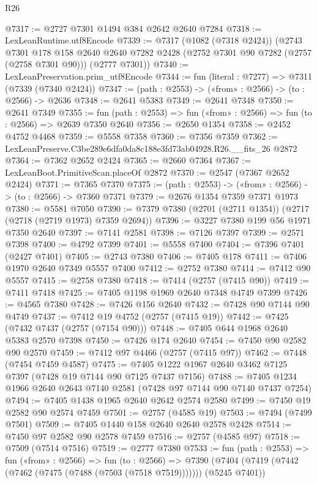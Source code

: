 \begin{lexlean}{R26}
\begin{coremodule}
@7317 := @2727 @7301 @1494 @384 @2642 @2640 @7284
@7318 := LexLeanRuntime.utf8Encode
@7339 := @7317
    (@1082 (@7318 @2424))
    (@2743
      @7301
      @178
      @158
      @2640
      @2640
      @7282
      @2428
      (@2752 @7301 @90 @7282 (@2757 (@2758 @7301 @90)))
      (@2777 @7301))
@7340 := LexLeanPreservation.prim_utf8Encode
@7344 := fun (literal : @7277) => @7311 (@7339 (@7340 @2424))
@7347 := (path : @2553) -> («from» : @2566) -> (to : @2566) -> @2636
@7348 := @2641 @5383
@7349 := @2641 @7348
@7350 := @2641 @7349
@7355 := fun (path : @2553) => fun («from» : @2566) => fun (to : @2566) => @2639 @7350 @2640
@7356 := @2650 @1354
@7358 := @2452 @4752 @4468
@7359 := @5558 @7358
@7360 := @7356 @7359
@7362 := LexLeanPreserve.C3be289e6dfa0da8c188e3fd73ab04928.R26.__fits_26 @2872
@7364 := @7362 @2652 @2424
@7365 := @2660 @7364
@7367 := LexLeanBoot.PrimitiveScan.placeOf @2872
@7370 := @2547 (@7367 @2652 @2424)
@7371 := @7365 @7370
@7375 := (path : @2553) -> («from» : @2566) -> (to : @2566) -> @7360 @7371
@7379 := @2676 @1354 @7359 @7371 @1973
@7380 := @5581 @7050
@7390 := @7379 @7380 (@2701 (@2711 @1354)) (@2717 (@2718 (@2719 @1973) @7359 @2694))
@7396 := @3227 @7380 @199 @56 @1971 @7350 @2640
@7397 := @7141 @2581
@7398 := @7126 @7397
@7399 := @2571 @7398
@7400 := @4792 @7399
@7401 := @5558 @7400
@7404 := @7396 @7401 (@2427 @7401)
@7405 := @2743 @7380
@7406 := @7405 @178
@7411 := @7406 @1970 @2640 @7349 @5557 @7400
@7412 := @2752 @7380
@7414 := @7412 @90 @5557
@7415 := @2758 @7380
@7418 := @7414 (@2757 (@7415 @90))
@7419 := @7411 @7418
@7425 := @7405 @1198 @1969 @2640 @7348 @4749 @7399
@7426 := @4565 @7380
@7428 := @7426 @156 @2640
@7432 := @7428 @90 @7144 @90 @4749
@7437 := @7412 @19 @4752 (@2757 (@7415 @19))
@7442 := @7425 (@7432 @7437 (@2757 (@7154 @90)))
@7448 := @7405 @644 @1968 @2640 @5383 @2570 @7398
@7450 := @7426 @174 @2640
@7454 := @7450 @90 @2582 @90 @2570
@7459 := @7412 @97 @4466 (@2757 (@7415 @97))
@7462 := @7448 (@7454 @7459 @4587)
@7475 := @7405 @1222 @1967 @2640 @3462 @7125 @7397 (@7428 @19 @7144 @90 @7125 @7437 @7156)
@7488 := @7405 @1234 @1966 @2640 @2643 @7140 @2581 (@7428 @97 @7144 @90 @7140 @7437 @7254)
@7494 := @7405 @1438 @1965 @2640 @2642 @2574 @2580
@7499 := @7450 @19 @2582 @90 @2574 @7459
@7501 := @2757 (@4585 @19)
@7503 := @7494 (@7499 @7501)
@7509 := @7405 @1440 @158 @2640 @2640 @2578 @2428
@7514 := @7450 @97 @2582 @90 @2578 @7459
@7516 := @2757 (@4585 @97)
@7518 := @7509 (@7514 @7516)
@7519 := @2777 @7380
@7533 := fun (path : @2553) =>
  fun («from» : @2566) =>
  fun (to : @2566) =>
  @7390 (@7404 (@7419 (@7442 (@7462 (@7475 (@7488 (@7503 (@7518 @7519))))))) (@5245 @7401))

\end{coremodule}
\end{lexlean}
